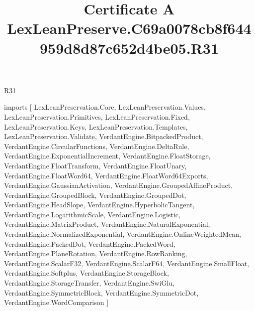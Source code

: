 \begin{lexlean}{R31}
\title{Certificate A LexLeanPreserve.C69a0078cb8f644959d8d87c652d4be05.R31}
\begin{coremodule}
imports [
  LexLeanPreservation.Core,
  LexLeanPreservation.Values,
  LexLeanPreservation.Primitives,
  LexLeanPreservation.Fixed,
  LexLeanPreservation.Keys,
  LexLeanPreservation.Templates,
  LexLeanPreservation.Validate,
  VerdantEngine.BitpackedProduct,
  VerdantEngine.CircularFunctions,
  VerdantEngine.DeltaRule,
  VerdantEngine.ExponentialIncrement,
  VerdantEngine.FloatStorage,
  VerdantEngine.FloatTransform,
  VerdantEngine.FloatUnary,
  VerdantEngine.FloatWord64,
  VerdantEngine.FloatWord64Exports,
  VerdantEngine.GaussianActivation,
  VerdantEngine.GroupedAffineProduct,
  VerdantEngine.GroupedBlock,
  VerdantEngine.GroupedDot,
  VerdantEngine.HeadSlope,
  VerdantEngine.HyperbolicTangent,
  VerdantEngine.LogarithmicScale,
  VerdantEngine.Logistic,
  VerdantEngine.MatrixProduct,
  VerdantEngine.NaturalExponential,
  VerdantEngine.NormalizedExponential,
  VerdantEngine.OnlineWeightedMean,
  VerdantEngine.PackedDot,
  VerdantEngine.PackedWord,
  VerdantEngine.PlaneRotation,
  VerdantEngine.RowRanking,
  VerdantEngine.ScalarF32,
  VerdantEngine.ScalarF64,
  VerdantEngine.SmallFloat,
  VerdantEngine.Softplus,
  VerdantEngine.StorageBlock,
  VerdantEngine.StorageTransfer,
  VerdantEngine.SwiGlu,
  VerdantEngine.SymmetricBlock,
  VerdantEngine.SymmetricDot,
  VerdantEngine.WordComparison
]


\end{coremodule}
\end{lexlean}
